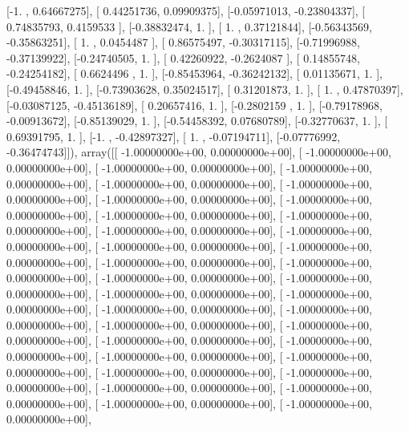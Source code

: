 \documentclass{article}
\begin{document}
       [-1.        ,  0.64667275],
       [ 0.44251736,  0.09909375],
       [-0.05971013, -0.23804337],
       [ 0.74835793,  0.4159533 ],
       [-0.38832474,  1.        ],
       [ 1.        ,  0.37121844],
       [-0.56343569, -0.35863251],
       [ 1.        ,  0.0454487 ],
       [ 0.86575497, -0.30317115],
       [-0.71996988, -0.37139922],
       [-0.24740505,  1.        ],
       [ 0.42260922, -0.2624087 ],
       [ 0.14855748, -0.24254182],
       [ 0.6624496 ,  1.        ],
       [-0.85453964, -0.36242132],
       [ 0.01135671,  1.        ],
       [-0.49458846,  1.        ],
       [-0.73903628,  0.35024517],
       [ 0.31201873,  1.        ],
       [ 1.        ,  0.47870397],
       [-0.03087125, -0.45136189],
       [ 0.20657416,  1.        ],
       [-0.2802159 ,  1.        ],
       [-0.79178968, -0.00913672],
       [-0.85139029,  1.        ],
       [-0.54458392,  0.07680789],
       [-0.32770637,  1.        ],
       [ 0.69391795,  1.        ],
       [-1.        , -0.42897327],
       [ 1.        , -0.07194711],
       [-0.07776992, -0.36474743]]), array([[ -1.00000000e+00,   0.00000000e+00],
       [ -1.00000000e+00,   0.00000000e+00],
       [ -1.00000000e+00,   0.00000000e+00],
       [ -1.00000000e+00,   0.00000000e+00],
       [ -1.00000000e+00,   0.00000000e+00],
       [ -1.00000000e+00,   0.00000000e+00],
       [ -1.00000000e+00,   0.00000000e+00],
       [ -1.00000000e+00,   0.00000000e+00],
       [ -1.00000000e+00,   0.00000000e+00],
       [ -1.00000000e+00,   0.00000000e+00],
       [ -1.00000000e+00,   0.00000000e+00],
       [ -1.00000000e+00,   0.00000000e+00],
       [ -1.00000000e+00,   0.00000000e+00],
       [ -1.00000000e+00,   0.00000000e+00],
       [ -1.00000000e+00,   0.00000000e+00],
       [ -1.00000000e+00,   0.00000000e+00],
       [ -1.00000000e+00,   0.00000000e+00],
       [ -1.00000000e+00,   0.00000000e+00],
       [ -1.00000000e+00,   0.00000000e+00],
       [ -1.00000000e+00,   0.00000000e+00],
       [ -1.00000000e+00,   0.00000000e+00],
       [ -1.00000000e+00,   0.00000000e+00],
       [ -1.00000000e+00,   0.00000000e+00],
       [ -1.00000000e+00,   0.00000000e+00],
       [ -1.00000000e+00,   0.00000000e+00],
       [ -1.00000000e+00,   0.00000000e+00],
       [ -1.00000000e+00,   0.00000000e+00],
       [ -1.00000000e+00,   0.00000000e+00],
       [ -1.00000000e+00,   0.00000000e+00],
       [ -1.00000000e+00,   0.00000000e+00],
       [ -1.00000000e+00,   0.00000000e+00],
       [ -1.00000000e+00,   0.00000000e+00],
       [ -1.00000000e+00,   0.00000000e+00],
       [ -1.00000000e+00,   0.00000000e+00],
\end{document}
